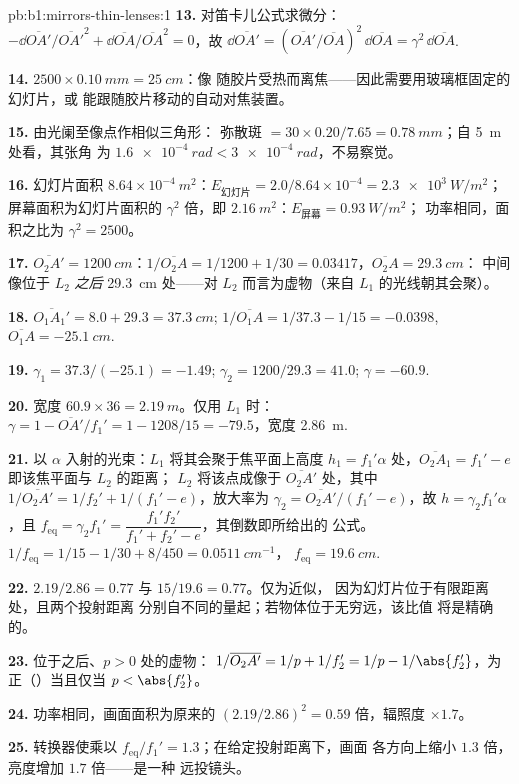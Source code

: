 \begin{solution}{pb:b1:mirrors-thin-lenses:1}
\textbf{13.} 对笛卡儿公式求微分：$-\dd\overline{OA'}/\overline{OA'}^2
+ \dd\overline{OA}/\overline{OA}^2 = 0$，故 $\dd\overline{OA'} =
(\overline{OA'}/\overline{OA})^2\,\dd\overline{OA} = \gamma^2\,\dd\overline{OA}$.

\textbf{14.} $2500 \times \qty{0.10}{mm} = \qty{25}{cm}$：像
随胶片受热而离焦——因此需要用玻璃框固定的幻灯片，或
能跟随胶片移动的自动对焦装置。

\textbf{15.} 由光阑至像点作相似三角形：
弥散斑 $= 30 \times 0.20/7.65 = \qty{0.78}{mm}$；自 \qty{5}{m} 处看，其张角
为 $\qty{1.6e-4}{rad} < \qty{3e-4}{rad}$，不易察觉。

\textbf{16.} 幻灯片面积 $8.64\times10^{-4}\ \unit{m^2}$：$E_{\text{幻灯片}}
= 2.0/8.64\times10^{-4} = \qty{2.3e3}{W/m^2}$；屏幕面积为幻灯片面积的 $\gamma^2$
倍，即 $\qty{2.16}{m^2}$：$E_{\text{屏幕}} = \qty{0.93}{W/m^2}$；
功率相同，面积之比为 $\gamma^2 = 2500$。

\textbf{17.} $\overline{O_2A'} = \qty{1200}{cm}$：$1/\overline{O_2A} =
1/1200 + 1/30 = 0.03417$，$\overline{O_2A} = \qty{+29.3}{cm}$：
中间像位于 $L_2$ \emph{之后} \qty{29.3}{cm} 处——对
$L_2$ 而言为虚物（来自 $L_1$ 的光线朝其会聚）。

\textbf{18.} $\overline{O_1A_1'} = 8.0 + 29.3 = \qty{37.3}{cm}$;
$1/\overline{O_1A} = 1/37.3 - 1/15 = -0.0398$, $\overline{O_1A} =
\qty{-25.1}{cm}$.

\textbf{19.} $\gamma_1 = 37.3/(-25.1) = -1.49$; $\gamma_2 = 1200/29.3 =
41.0$; $\gamma = -60.9$.

\textbf{20.} 宽度 $60.9 \times 36 = \qty{2.19}{m}$。仅用 $L_1$ 时：
$\gamma = 1 - \overline{OA'}/f_1' = 1 - 1208/15 = -79.5$，宽度
\qty{2.86}{m}.

\textbf{21.} 以 $\alpha$ 入射的光束：$L_1$ 将其会聚于焦平面上高度 $h_1 = f_1'\alpha$
处，$\overline{O_2A_1} = f_1' - e$ 即该焦平面与 $L_2$ 的距离；
$L_2$ 将该点成像于 $\overline{O_2A'}$ 处，其中 $1/\overline{O_2A'}
= 1/f_2' + 1/(f_1' - e)$，放大率为 $\gamma_2 = \overline{O_2A'}/(f_1'
- e)$，故 $h = \gamma_2 f_1'\alpha$，且 $f_{\mathrm{eq}} = \gamma_2 f_1'
= \dfrac{f_1' f_2'}{f_1' + f_2' - e}$，其倒数即所给出的
公式。$1/f_{\mathrm{eq}} = 1/15 - 1/30 + 8/450 = \qty{0.0511}{cm^{-1}}$，
$f_{\mathrm{eq}} = \qty{19.6}{cm}$.

\textbf{22.} $2.19/2.86 = 0.77$ 与 $15/19.6 = 0.77$。仅为近似，
因为幻灯片位于有限距离处，且两个投射距离
分别自不同的量起；若物体位于无穷远，该比值
将是精确的。

\textbf{23.} 位于之后、$p > 0$ 处的虚物：
$1/\overline{O_2A'} = 1/p + 1/f_2' = 1/p - 1/\abs{f_2'}$，为正（）当且仅当 $p < \abs{f_2'}$。

\textbf{24.} 功率相同，画面面积为原来的 $(2.19/2.86)^2 = 0.59$
倍，辐照度 $\times 1.7$。

\textbf{25.} 转换器使乘以
$f_{\mathrm{eq}}/f_1' = 1.3$；在给定投射距离下，画面
各方向上缩小 $1.3$ 倍，亮度增加 $1.7$ 倍——是一种
远投镜头。
\end{solution}
